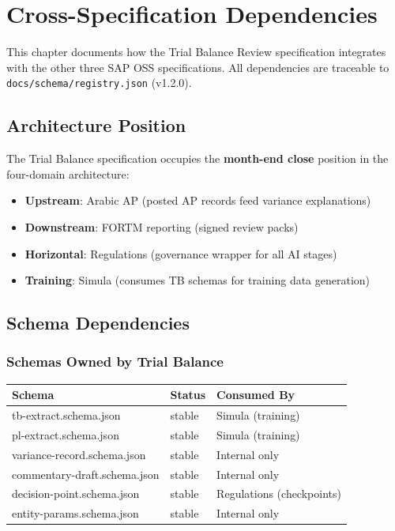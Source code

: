 
\chapter{Cross-Specification Dependencies}
\label{ch:cross-spec}

This chapter documents how the Trial Balance Review specification integrates
with the other three SAP OSS specifications. All dependencies are traceable
to \texttt{docs/schema/registry.json} (v1.2.0).

\section{Architecture Position}
\label{sec:arch-position}

The Trial Balance specification occupies the \textbf{month-end close} position
in the four-domain architecture:

\begin{itemize}
  \item \textbf{Upstream}: Arabic AP (posted AP records feed variance explanations)
  \item \textbf{Downstream}: FORTM reporting (signed review packs)
  \item \textbf{Horizontal}: Regulations (governance wrapper for all AI stages)
  \item \textbf{Training}: Simula (consumes TB schemas for training data generation)
\end{itemize}

\section{Schema Dependencies}
\label{sec:schema-deps}

\subsection{Schemas Owned by Trial Balance}

\begin{tabularx}{\linewidth}{@{}l l X@{}}
\toprule
\textbf{Schema} & \textbf{Status} & \textbf{Consumed By} \\
\midrule
tb-extract.schema.json & stable & Simula (training) \\
pl-extract.schema.json & stable & Simula (training) \\
variance-record.schema.json & stable & Internal only \\
commentary-draft.schema.json & stable & Internal only \\
decision-point.schema.json & stable & Regulations (checkpoints) \\
entity-params.schema.json & stable & Internal only \\
\bottomrule
\end{tabularx}

